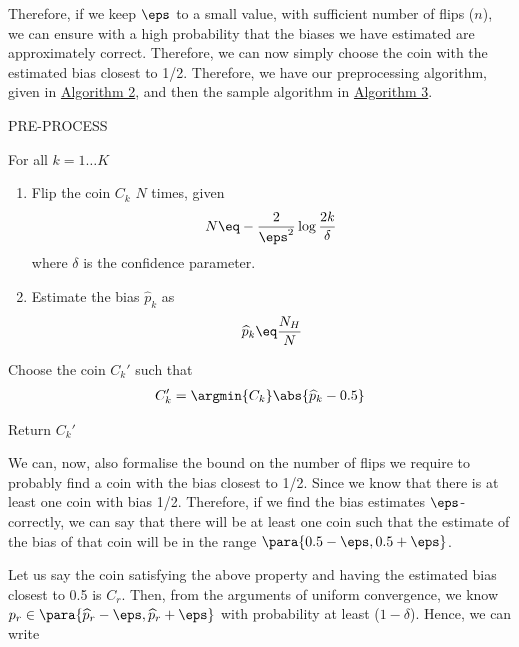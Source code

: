 \documentclass[a4paper,10pt]{article}
\begin{document}
\begin{question}
	Therefore, if we keep $\eps$ to a small value, with sufficient number of flips ($n$), we can ensure with a high probability that the biases we have estimated are approximately correct.
	Therefore, we can now simply choose the coin with the estimated bias closest to 1/2.
	Therefore, we have our preprocessing algorithm, given in \hyperlink{algo:1.2}{Algorithm 2}, and then the sample algorithm in \hyperlink{algo:1.3}{Algorithm 3}.

	\begin{algo}[0.9\textwidth]{PRE-PROCESS}

		For all $k = 1 \dots K$
		\begin{enumerate}
			\item Flip the coin $C_k$ $N$ times, given
				\begin{align*}
					N	\eq	- \frac{2}{\eps^2}\log{\frac{2k}{\delta}}
				\end{align*}
				where $\delta$ is the confidence parameter.
			\item Estimate the bias $\widehat{p}_k$ as
				\begin{align*}
					\widehat{p}_k	\eq	\frac{N_H}{N}
				\end{align*}
		\end{enumerate}

		Choose the coin $C_k'$ such that
		\begin{align*}
			C_k' = \argmin{C_k} \abs{\widehat{p}_k - 0.5}
		\end{align*}

		Return $C_k'$

	\end{algo}

	We can, now, also formalise the bound on the number of flips we require to probably find a coin with the bias closest to 1/2. Since we know that there is at least one coin with bias 1/2. Therefore, if we find the bias estimates $\eps$-correctly, we can say that there will be at least one coin such that the estimate of the bias of that coin will be in the range $\para{0.5 - \eps, 0.5 + \eps}$.

	Let us say the coin satisfying the above property and having the estimated bias closest to 0.5 is $C_r$. Then, from the arguments of uniform convergence, we know $p_r \in \para{\widehat{p}_r - \eps, \widehat{p}_r + \eps}$ with probability at least ($1 - \delta$). Hence, we can write


\end{question}
\end{document}
